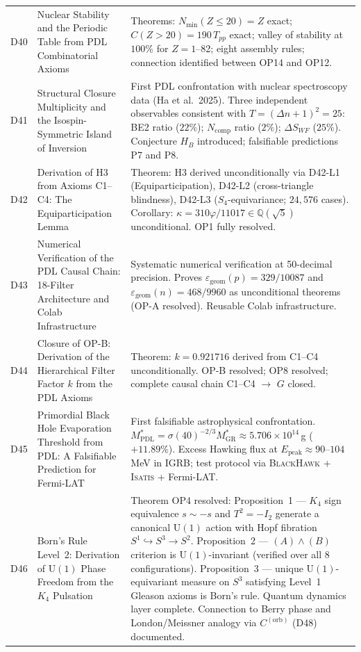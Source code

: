 \documentclass[11pt,a4paper]{article}
\theoremstyle{plain}
\theoremstyle{definition}
\theoremstyle{remark}
\newcommand{\Tpp}{T_{pp}}
\begin{document}
\begin{longtable}{L{1.3cm}L{3.8cm}L{8.0cm}}
D40 & Nuclear Stability and the Periodic Table from PDL Combinatorial Axioms~\cite{D40} & \textcolor{proofblue}{Theorems}: $N_{\min}(Z\leq20)=Z$ exact; $C(Z>20)=190\,\Tpp$ exact; valley of stability at $100\%$ for $Z=1$--82; eight assembly rules; connection identified between OP14 and OP12.\\[0.4em]
D41 & Structural Closure Multiplicity and the Isospin-Symmetric Island of Inversion~\cite{D41} & First PDL confrontation with nuclear spectroscopy data (Ha et al.~2025). Three independent observables consistent with $T=(\Delta n+1)^2=25$: BE2 ratio ($22\%$); $N_{\mathrm{comp}}$ ratio ($2\%$); $\Delta S_{WF}$ ($25\%$). Conjecture $H_B$ introduced; falsifiable predictions P7 and P8.\\[0.4em]
D42 & Derivation of H3 from Axioms C1--C4: The Equiparticipation Lemma~\cite{D42} & \textcolor{proofblue}{Theorem}: H3 derived unconditionally via D42-L1 (Equiparticipation), D42-L2 (cross-triangle blindness), D42-L3 ($S_4$-equivariance; $24{,}576$ cases). Corollary: $\kappa=310\varphi/11017\in\mathbb{Q}(\sqrt{5})$ unconditional. OP1 fully resolved.\\[0.4em]
D43 & Numerical Verification of the PDL Causal Chain: 18-Filter Architecture and Colab Infrastructure~\cite{D43} & Systematic numerical verification at 50-decimal precision. Proves $\varepsilon_{\mathrm{geom}}(p) = 329/10087$ and $\varepsilon_{\mathrm{geom}}(n) = 468/9960$ as unconditional theorems (OP-A resolved). Reusable Colab infrastructure.\\[0.4em]
D44 & Closure of OP-B: Derivation of the Hierarchical Filter Factor $k$ from the PDL Axioms~\cite{D44} & \textcolor{proofblue}{Theorem}: $k = 0.921716$ derived from C1--C4 unconditionally. OP-B resolved; OP8 resolved; complete causal chain C1--C4 $\to$ $G$ closed.\\[0.4em]
D45 & Primordial Black Hole Evaporation Threshold from PDL: A Falsifiable Prediction for Fermi-LAT~\cite{D45} & First falsifiable astrophysical confrontation. $M^*_{\mathrm{PDL}} = \sigma(40)^{-2/3} M^*_{\mathrm{GR}} \approx 5.706 \times 10^{14}$\,g ($+11.89\%$). Excess Hawking flux at $E_{\mathrm{peak}} \approx 90$--$104$\,MeV in IGRB; test protocol via \textsc{BlackHawk} + \textsc{Isatis} + Fermi-LAT.\\[0.4em]
D46 & Born's Rule Level~2: Derivation of $\mathrm{U}(1)$ Phase Freedom from the $K_4$ Pulsation~\cite{D46} & \textcolor{proofblue}{Theorem} OP4 resolved: Proposition~1 — $K_4$ sign equivalence $s \sim -s$ and $T^2=-I_2$ generate a canonical $\mathrm{U}(1)$ action with Hopf fibration $S^1\hookrightarrow S^3\to S^2$. Proposition~2 — $(A)\wedge(B)$ criterion is $\mathrm{U}(1)$-invariant (verified over all 8 configurations). Proposition~3 — unique $\mathrm{U}(1)$-equivariant measure on $S^3$ satisfying Level~1 Gleason axioms is Born's rule. Quantum dynamics layer complete. Connection to Berry phase and London/Meissner analogy via $C^{(\mathrm{orb})}$ (D48) documented.\\[0.4em]

\end{longtable}
\end{document}
